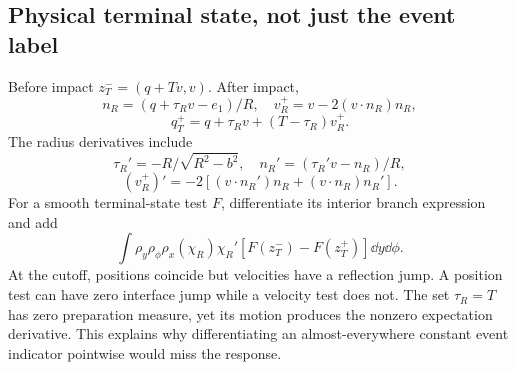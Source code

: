 \subsection{Physical terminal state, not just the event label}
Before impact $z_T^-=(q+Tv,v)$. After impact,
\[
 n_R=(q+\tau_Rv-e_1)/R,\quad v_R^+=v-2(v\cdot n_R)n_R,
\]
\[
 q_T^+=q+\tau_Rv+(T-\tau_R)v_R^+.
\]
The radius derivatives include
\[
 \tau_R'=-R/\sqrt{R^2-b^2},\quad n_R'=(\tau_R'v-n_R)/R,
\]
\[
 (v_R^+)'=-2[(v\cdot n_R')n_R+(v\cdot n_R)n_R'].
\]
For a smooth terminal-state test $F$, differentiate its interior branch expression and add
\[
 \int\rho_y\rho_\phi\rho_x(\chi_R)\chi_R'
 [F(z_T^-)-F(z_T^+)]\dd y\dd\phi.
\]
At the cutoff, positions coincide but velocities have a reflection jump. A position test can have zero interface jump while a velocity test does not. The set $\tau_R=T$ has zero preparation measure, yet its motion produces the nonzero expectation derivative. This explains why differentiating an almost-everywhere constant event indicator pointwise would miss the response.
\par

